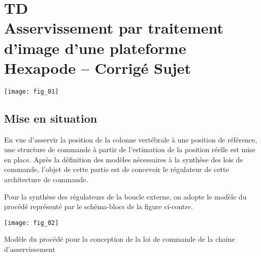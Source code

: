 \chapter*{TD  \\ 
Asservissement par traitement d’image d’une plateforme Hexapode -- 
\ifprof Corrigé \else Sujet \fi}

\iflivret {} \else
\ifprof  {} \else \fi
\fi

\setcounter{question}{0}

\begin{marginfigure} [4cm]
\centering
\texttt{[image: fig\_01]}
\end{marginfigure}


\section*{Mise en situation}
\ifprof
\else
\begin{obj}
En vue d’asservir la position de la colonne vertébrale à une position de référence, une structure de
commande à partir de l’estimation de la position réelle est mise en place. Après la définition des
modèles nécessaires à la synthèse des lois de commande, l’objet de cette partie est de concevoir le
régulateur de cette architecture de commande.
\end{obj}


Pour la synthèse des régulateurs de la boucle externe, on adopte le modèle du procédé représenté par le schéma-blocs de la figure ci-contre. 

\begin{marginfigure}[3cm]
\texttt{[image: fig\_02]}
\caption{Modèle du procédé pour la conception de la loi de commande
de la chaine d’asservissement}
\end{marginfigure}
\fi

